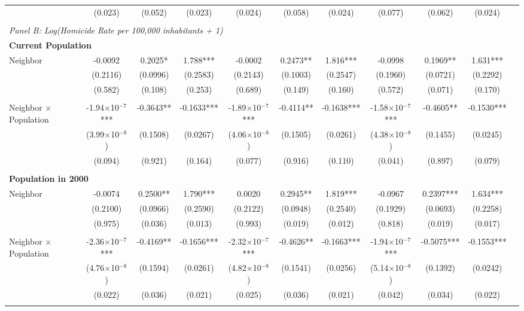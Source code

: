 \documentclass{article}
\begin{document}
\begin{table}[htbp]
\begin{adjustbox}{width=\textwidth}
\begin{tabular}{lcccccccccc}
& (0.023) & (0.052) & (0.023) & (0.024) & (0.058) & (0.024) & (0.077) & (0.062) & (0.024) \\\\
\midrule
\multicolumn{10}{l}{\textit{Panel B: Log(Homicide Rate per 100,000 inhabitants + 1)}} \\[0.5em]
\multicolumn{10}{l}{\textbf{Current Population}} \\[0.5em]
Neighbor & -0.0092 & 0.2025* & 1.788*** & -0.0002 & 0.2473** & 1.816*** & -0.0998 & 0.1969** & 1.631*** \\
& (0.2116) & (0.0996) & (0.2583) & (0.2143) & (0.1003) & (0.2547) & (0.1960) & (0.0721) & (0.2292) \\
& (0.582) & (0.108) & (0.253) & (0.689) & (0.149) & (0.160) & (0.572) & (0.071) & (0.170) \\\\
Neighbor × Population & -1.94$\times$10$^{-7}$*** & -0.3643** & -0.1633*** & -1.89$\times$10$^{-7}$*** & -0.4114** & -0.1638*** & -1.58$\times$10$^{-7}$*** & -0.4605** & -0.1530*** \\
& (3.99$\times$10$^{-8}$) & (0.1508) & (0.0267) & (4.06$\times$10$^{-8}$) & (0.1505) & (0.0261) & (4.38$\times$10$^{-8}$) & (0.1455) & (0.0245) \\
& (0.094) & (0.921) & (0.164) & (0.077) & (0.916) & (0.110) & (0.041) & (0.897) & (0.079) \\\\
\multicolumn{10}{l}{\textbf{Population in 2000}} \\[0.5em]
Neighbor & -0.0074 & 0.2500** & 1.790*** & 0.0020 & 0.2945** & 1.819*** & -0.0967 & 0.2397*** & 1.634*** \\
& (0.2100) & (0.0966) & (0.2590) & (0.2122) & (0.0948) & (0.2540) & (0.1929) & (0.0693) & (0.2258) \\
& (0.975) & (0.036) & (0.013) & (0.993) & (0.019) & (0.012) & (0.818) & (0.019) & (0.017) \\\\
Neighbor × Population & -2.36$\times$10$^{-7}$*** & -0.4169** & -0.1656*** & -2.32$\times$10$^{-7}$*** & -0.4626** & -0.1663*** & -1.94$\times$10$^{-7}$*** & -0.5075*** & -0.1553*** \\
& (4.76$\times$10$^{-8}$) & (0.1594) & (0.0261) & (4.82$\times$10$^{-8}$) & (0.1541) & (0.0256) & (5.14$\times$10$^{-8}$) & (0.1392) & (0.0242) \\
& (0.022) & (0.036) & (0.021) & (0.025) & (0.036) & (0.021) & (0.042) & (0.034) & (0.022) \\\\

\end{tabular}
\end{adjustbox}
\end{table}
\end{document}
